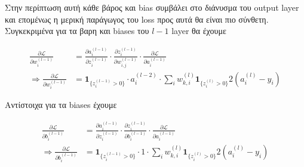 \documentclass[a4paper,12pt]{article}
\begin{document}

Στην περίπτωση αυτή κάθε βάρος και bias συμβάλει στο διάνυσμα του output layer και επομένως η μερική παράγωγος του loss προς αυτά θα είναι πιο σύνθετη. Συγκεκριμένα για τα βαρη και biases του $l-1$ layer θα έχουμε

\begin{align}
\frac{\partial \mathcal{L}}{\partial w_{i}^{(l-1)}}  &=  \frac{\partial a_{i}^{(l-1)}}{\partial z_{i}^{(l-1)}}  \cdot \frac{\partial z_{i}^{(l-1)}}{\partial w_{i,j}^{(l-1)}} \cdot \frac{\partial \mathcal{L}}{\partial a_{i}^{(l-1)}}  \label{eq:grad_weight1} \\
\Rightarrow \frac{\partial \mathcal{L}}{\partial w_{i}^{(l-1)}}  &= \mathbf{1}_{\{z_{i}^{(l-1)}>0\} } \cdot a_{i}^{(l-2)} \cdot \sum_{i} w_{k,i}^{(l)}\mathbf{1}_{\{z_{i}^{(l)}>0\} } 2(a_{i}^{(l)} - y_i) \label{eq:grad_weight2}
\end{align}

Αντίστοιχα για τα biases έχουμε 

\begin{align}
\frac{\partial \mathcal{L}}{\partial b_{i}^{(l-1)}}  &= \frac{\partial a_{i}^{(l-1)}}{\partial z_{i}^{(l-1)}}  \cdot \frac{\partial z_{i}^{(l-1)}}{\partial b_{i}^{(l-1)}} \cdot \frac{\partial \mathcal{L}}{\partial a_{i}^{(l-1)}} \label{eq:grad_bias1} \\
\Rightarrow \frac{\partial \mathcal{L}}{\partial b_{i}^{(l-1)}}  &= \mathbf{1}_{\{z_{i}^{(l-1)}>0\} } \cdot 1 \cdot \sum_{i} w_{k,i}^{(l)}\mathbf{1}_{\{z_{i}^{(l)}>0\} } 2(a_{i}^{(l)} - y_i) \label{eq:grad_bias2}
\end{align}
\end{document}
